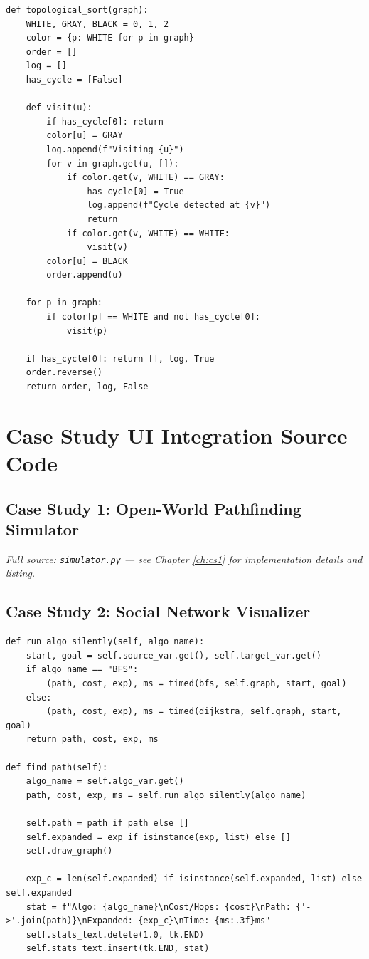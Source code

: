 \documentclass[12pt, a4paper, oneside]{report}
\theoremstyle{definition}
\begin{document}
\begin{lstlisting}[caption={DFS-based Topological Sort (from core.algorithms)}]
def topological_sort(graph):
    WHITE, GRAY, BLACK = 0, 1, 2
    color = {p: WHITE for p in graph}
    order = []
    log = []
    has_cycle = [False]

    def visit(u):
        if has_cycle[0]: return
        color[u] = GRAY
        log.append(f"Visiting {u}")
        for v in graph.get(u, []):
            if color.get(v, WHITE) == GRAY:
                has_cycle[0] = True
                log.append(f"Cycle detected at {v}")
                return
            if color.get(v, WHITE) == WHITE:
                visit(v)
        color[u] = BLACK
        order.append(u)

    for p in graph:
        if color[p] == WHITE and not has_cycle[0]:
            visit(p)

    if has_cycle[0]: return [], log, True
    order.reverse()
    return order, log, False
\end{lstlisting}

\chapter{Case Study UI Integration Source Code}

\section{Case Study 1: Open-World Pathfinding Simulator}
\textit{Full source: \texttt{simulator.py} — see Chapter \ref{ch:cs1} for implementation details and listing.}

\section{Case Study 2: Social Network Visualizer}

\begin{lstlisting}[caption={BFS and Dijkstra routing logic on social graph (from social\_network.py)},
                   basicstyle=\ttfamily\footnotesize]
def run_algo_silently(self, algo_name):
    start, goal = self.source_var.get(), self.target_var.get()
    if algo_name == "BFS":
        (path, cost, exp), ms = timed(bfs, self.graph, start, goal)
    else:
        (path, cost, exp), ms = timed(dijkstra, self.graph, start, goal)
    return path, cost, exp, ms

def find_path(self):
    algo_name = self.algo_var.get()
    path, cost, exp, ms = self.run_algo_silently(algo_name)
    
    self.path = path if path else []
    self.expanded = exp if isinstance(exp, list) else []
    self.draw_graph()
    
    exp_c = len(self.expanded) if isinstance(self.expanded, list) else self.expanded
    stat = f"Algo: {algo_name}\nCost/Hops: {cost}\nPath: {'->'.join(path)}\nExpanded: {exp_c}\nTime: {ms:.3f}ms"
    self.stats_text.delete(1.0, tk.END)
    self.stats_text.insert(tk.END, stat)
\end{lstlisting}
\end{document}
